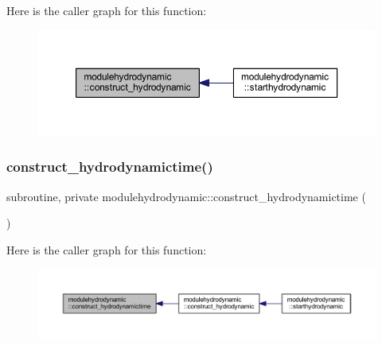 Here is the caller graph for this function\+:\nopagebreak
\begin{figure}[H]
\begin{center}
\leavevmode
\includegraphics[width=350pt]{namespacemodulehydrodynamic_a71f29b5c93f202c8e783ecb892b1b497_icgraph}
\end{center}
\end{figure}
\mbox{\label{namespacemodulehydrodynamic_adacb48ce53fa202c94f8c282a714e069}} 
\subsubsection{\texorpdfstring{construct\+\_\+hydrodynamictime()}{construct\_hydrodynamictime()}}
{\footnotesize\ttfamily subroutine, private modulehydrodynamic\+::construct\+\_\+hydrodynamictime (\begin{DoxyParamCaption}{ }\end{DoxyParamCaption})\hspace{0.3cm}{\ttfamily [private]}}

Here is the caller graph for this function\+:\nopagebreak
\begin{figure}[H]
\begin{center}
\leavevmode
\includegraphics[width=350pt]{namespacemodulehydrodynamic_adacb48ce53fa202c94f8c282a714e069_icgraph}
\end{center}
\end{figure}
\mbox{\label{namespacemodulehydrodynamic_aec1826f2eaf93245fac759d36238b464}} 
